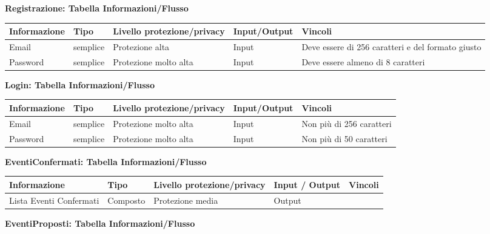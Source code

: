 \hfill \break
\clearpage
\textbf{Registrazione: Tabella Informazioni/Flusso}
\hfill \break

\begin{tabular} {|P{3cm}|P{3cm}|P{3cm}|P{3cm}|P{3cm}|}
    \hline
    \textbf{Informazione} & \textbf{Tipo} & \textbf{Livello protezione/privacy} & \textbf{Input/Output} & \textbf{Vincoli}                                  \\
    \hline
    Email                 & semplice      & Protezione alta                     & Input                 & Deve essere di 256 caratteri e del formato giusto \\
    \hline
    Password              & semplice      & Protezione molto alta               & Input                 & Deve essere almeno di 8 caratteri                 \\
    \hline
\end{tabular}
\hfill \break

\textbf{Login: Tabella Informazioni/Flusso}
\hfill \break

\begin{tabular} {|P{3cm}|P{3cm}|P{3cm}|P{3cm}|P{3cm}|}
    \hline
    \textbf{Informazione} & \textbf{Tipo} & \textbf{Livello protezione/privacy} & \textbf{Input/Output} & \textbf{Vincoli}         \\
    \hline
    Email                 & semplice      & Protezione molto alta               & Input                 & Non più di 256 caratteri \\
    \hline
    Password              & semplice      & Protezione molto alta               & Input                 & Non più di 50 caratteri  \\
    \hline
\end{tabular}
\hfill \break

\textbf{EventiConfermati: Tabella Informazioni/Flusso}
\hfill \break

\begin{tabular} {|P{3cm}|P{3cm}|P{3cm}|P{3cm}|P{3cm}|}
    \hline
    \textbf{Informazione}   & \textbf{Tipo} & \textbf{Livello protezione/privacy} & \textbf{Input / Output} & \textbf{Vincoli} \\
    \hline
    Lista Eventi Confermati & Composto      & Protezione media                    & Output                  &                  \\
    \hline
\end{tabular}
\hfill \break

\textbf{EventiProposti: Tabella Informazioni/Flusso}
\hfill \break

